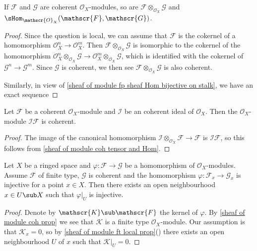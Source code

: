 \begin{corollary}\label{sheaf of module coh tensor and Hom}
If $\mathscr{F}$ and $\mathscr{G}$ are coherent $\mathscr{O}_X$-modules, so are $\mathscr{F}\otimes_{\mathscr{O}_X}\mathscr{G}$ and $\sHom_{\mathscr{O}_X}(\mathscr{F},\mathscr{G})$.
\end{corollary}
\begin{proof}
Since the question is local, we can assume that $\mathscr{F}$ is the cokernel of a homomorphism $\mathscr{O}_X^n\to\mathscr{O}_X^m$. Then $\mathscr{F}\otimes_{\mathscr{O}_X}\mathscr{G}$ is isomorphic to the cokernel of the homomorphism $\mathscr{O}_X^n\otimes_{\mathscr{O}_X}\mathscr{G}\to\mathscr{O}_X^m\otimes_{\mathscr{O}_X}\mathscr{G}$, which is identified with the cokernel of $\mathscr{G}^n\to\mathscr{G}^m$. Since $\mathscr{G}$ is coherent, we then see $\mathscr{F}\otimes_{\mathscr{O}_X}\mathscr{G}$ is also coherent.\par
Similarly, in view of \cref{sheaf of module fp sheaf Hom bijective on stalk}, we have an exact sequence 
\end{proof}
\begin{corollary}
Let $\mathscr{F}$ be a coherent $\mathscr{O}_X$-module and $\mathscr{I}$ be an coherent ideal of $\mathscr{O}_X$. Then the $\mathscr{O}_X$-module $\mathscr{I}\mathscr{F}$ is coherent.
\end{corollary}
\begin{proof}
The image of the canonical homomorphism $\mathscr{I}\otimes_{\mathscr{O}_X}\mathscr{F}\to\mathscr{F}$ is $\mathscr{I}\mathscr{F}$, so this follows from \cref{sheaf of module coh tensor and Hom}. 
\end{proof}
\begin{corollary}\label{sheaf of module coh injective on stalk prop}
Let $X$ be a ringed space and $\varphi:\mathscr{F}\to\mathscr{G}$ be a homomorphism of $\mathscr{O}_X$-modules. Assume $\mathscr{F}$ of finite type, $\mathscr{G}$ is coherent and the homomorphism $\varphi:\mathscr{F}_x\to\mathscr{G}_x$ is injective for a point $x\in X$. Then there exists an open neighbourhood $x\in U\sub X$ such that $\varphi|_U$ is injective.
\end{corollary}
\begin{proof}
Denote by $\mathscr{K}\sub\mathscr{F}$ the kernel of $\varphi$. By \cref{sheaf of module coh prop} we see that $\mathscr{K}$ is a finite type $\mathscr{O}_X$-module. Our assumption is that $\mathscr{K}_x=0$, so by \cref{sheaf of module ft local prop}() there exists an open neighbourhood $U$ of $x$ such that $\mathscr{K}|_U=0$.
\end{proof}
